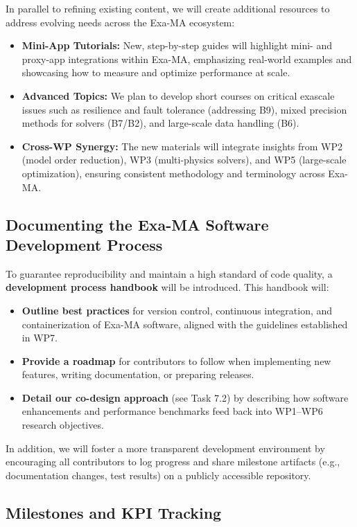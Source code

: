 In parallel to refining existing content, we will create additional resources to address evolving needs across the Exa-MA ecosystem:
\begin{itemize}
    \item \textbf{Mini-App Tutorials:} 
    New, step-by-step guides will highlight mini- and proxy-app integrations within Exa-MA, emphasizing real-world examples and showcasing how to measure and optimize performance at scale.
    \item \textbf{Advanced Topics:}
    We plan to develop short courses on critical exascale issues such as resilience and fault tolerance (addressing B9), mixed precision methods for solvers (B7/B2), and large-scale data handling (B6).
    \item \textbf{Cross-WP Synergy:}
    The new materials will integrate insights from WP2 (model order reduction), WP3 (multi-physics solvers), and WP5 (large-scale optimization), ensuring consistent methodology and terminology across Exa-MA.
\end{itemize}

\subsection{Documenting the Exa-MA Software Development Process}

To guarantee reproducibility and maintain a high standard of code quality, a \textbf{development process handbook} will be introduced. This handbook will:
\begin{itemize}
    \item \textbf{Outline best practices} for version control, continuous integration, and containerization of Exa-MA software, aligned with the guidelines established in WP7.
    \item \textbf{Provide a roadmap} for contributors to follow when implementing new features, writing documentation, or preparing releases.
    \item \textbf{Detail our co-design approach} (see Task 7.2) by describing how software enhancements and performance benchmarks feed back into WP1--WP6 research objectives.
\end{itemize}

In addition, we will foster a more transparent development environment by encouraging all contributors to log progress and share milestone artifacts (e.g., documentation changes, test results) on a publicly accessible repository.

\subsection{Milestones and KPI Tracking}


